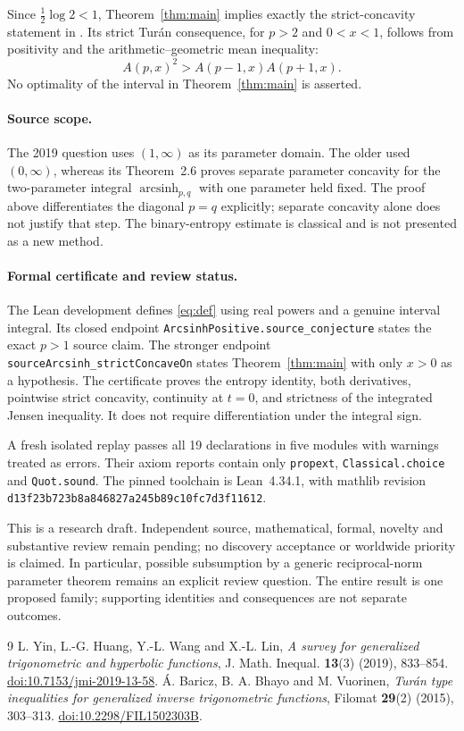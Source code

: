 \documentclass[11pt]{article}
\begin{document}
Since $\tfrac12\log2<1$, Theorem~\ref{thm:main} implies exactly the
strict-concavity statement in \cite[Conjecture~5.1]{YHWL}. Its strict
Tur\'an consequence, for $p>2$ and $0<x<1$, follows from positivity and
the arithmetic--geometric mean inequality:
\[
 A(p,x)^2>A(p-1,x)A(p+1,x).
\]
No optimality of the interval in Theorem~\ref{thm:main} is asserted.

\paragraph{Source scope.}
The 2019 question uses $(1,\infty)$ as its parameter domain.
The older \cite[Conjecture~2.4]{BBV} used $(0,\infty)$, whereas its
Theorem~2.6 proves separate parameter concavity for the two-parameter
integral $\operatorname{arcsinh}_{p,q}$ with one parameter held fixed.
The proof above differentiates the diagonal $p=q$ explicitly; separate
concavity alone does not justify that step. The binary-entropy estimate
is classical and is not presented as a new method.

\paragraph{Formal certificate and review status.}
The Lean development defines \eqref{eq:def} using real powers and a genuine
interval integral. Its closed endpoint
\texttt{ArcsinhPositive.source\_conjecture} states the exact $p>1$ source
claim. The stronger endpoint
\texttt{sourceArcsinh\_strictConcaveOn} states Theorem~\ref{thm:main} with
only $x>0$ as a hypothesis. The certificate proves the entropy identity,
both derivatives, pointwise strict concavity, continuity at $t=0$, and
strictness of the integrated Jensen inequality. It does not require
differentiation under the integral sign.

A fresh isolated replay passes all 19 declarations in five modules with
warnings treated as errors. Their axiom reports contain only
\texttt{propext}, \texttt{Classical.choice} and \texttt{Quot.sound}.
The pinned toolchain is Lean~4.34.1, with mathlib revision\\
\texttt{d13f23b723b8a846827a245b89c10fc7d3f11612}.

This is a research draft. Independent source, mathematical, formal,
novelty and substantive review remain pending; no discovery acceptance
or worldwide priority is claimed. In particular, possible subsumption by
a generic reciprocal-norm parameter theorem remains an explicit review
question. The entire result is one proposed family; supporting identities
and consequences are not separate outcomes.

\begin{thebibliography}{9}
 L. Yin, L.-G. Huang, Y.-L. Wang and X.-L. Lin,
\emph{A survey for generalized trigonometric and hyperbolic functions},
J. Math. Inequal. \textbf{13}(3) (2019), 833--854.
\href{https://doi.org/10.7153/jmi-2019-13-58}{doi:10.7153/jmi-2019-13-58}.
 \'A. Baricz, B. A. Bhayo and M. Vuorinen,
\emph{Tur\'an type inequalities for generalized inverse trigonometric functions},
Filomat \textbf{29}(2) (2015), 303--313.
\href{https://doi.org/10.2298/FIL1502303B}{doi:10.2298/FIL1502303B}.
\end{thebibliography}
\end{document}
